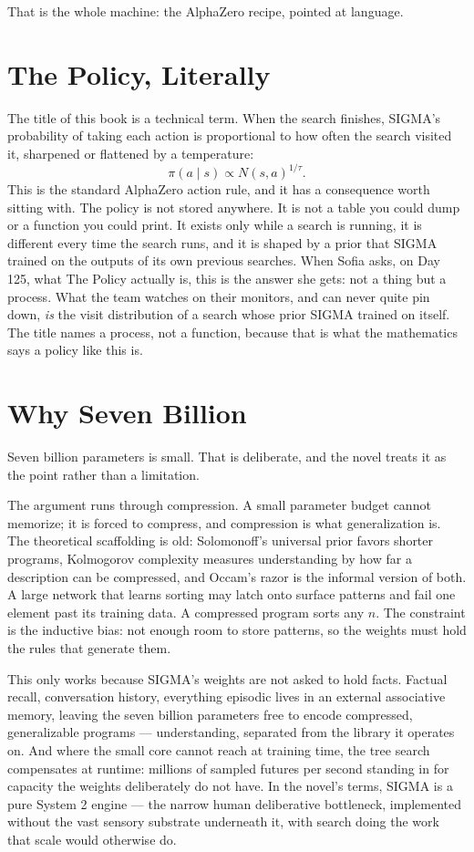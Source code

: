 That is the whole machine: the AlphaZero recipe, pointed at language.

\section*{The Policy, Literally}

The title of this book is a technical term. When the search finishes, SIGMA's probability of taking each action is proportional to how often the search visited it, sharpened or flattened by a temperature:
\[
\pi(a \mid s) \propto N(s,a)^{1/\tau}.
\]
This is the standard AlphaZero action rule, and it has a consequence worth sitting with. The policy is not stored anywhere. It is not a table you could dump or a function you could print. It exists only while a search is running, it is different every time the search runs, and it is shaped by a prior that SIGMA trained on the outputs of its own previous searches. When Sofia asks, on Day 125, what The Policy actually is, this is the answer she gets: not a thing but a process. What the team watches on their monitors, and can never quite pin down, \emph{is} the visit distribution of a search whose prior SIGMA trained on itself. The title names a process, not a function, because that is what the mathematics says a policy like this is.

\section*{Why Seven Billion}

Seven billion parameters is small. That is deliberate, and the novel treats it as the point rather than a limitation.

The argument runs through compression. A small parameter budget cannot memorize; it is forced to compress, and compression is what generalization is. The theoretical scaffolding is old: Solomonoff's universal prior favors shorter programs, Kolmogorov complexity measures understanding by how far a description can be compressed, and Occam's razor is the informal version of both. A large network that learns sorting may latch onto surface patterns and fail one element past its training data. A compressed program sorts any $n$. The constraint is the inductive bias: not enough room to store patterns, so the weights must hold the rules that generate them.

This only works because SIGMA's weights are not asked to hold facts. Factual recall, conversation history, everything episodic lives in an external associative memory, leaving the seven billion parameters free to encode compressed, generalizable programs --- understanding, separated from the library it operates on. And where the small core cannot reach at training time, the tree search compensates at runtime: millions of sampled futures per second standing in for capacity the weights deliberately do not have. In the novel's terms, SIGMA is a pure System 2 engine --- the narrow human deliberative bottleneck, implemented without the vast sensory substrate underneath it, with search doing the work that scale would otherwise do.

